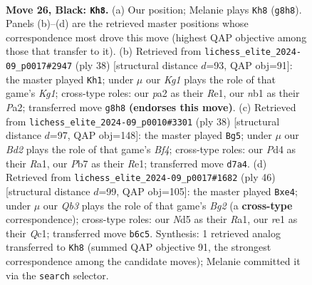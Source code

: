 \documentclass[11pt]{article}
\begin{document}
\clearpage

\begin{figure}[p]\centering
\begin{subfigure}{0.46\textwidth}\centering
\resizebox{\linewidth}{!}{%
\newchessgame
\chessboard[
  setfen={r3r1k1/bp1b1pp1/pq2p3/3n3P/3p4/BP4QB/P2P1P1P/RN2RK2 b - - 4 26},
  showmover=false,
  pgfstyle=straightmove, color=movearrow, markmove={g8-h8}
]}
\caption{}
\end{subfigure}\hfill
\begin{subfigure}{0.46\textwidth}\centering
\resizebox{\linewidth}{!}{%
\newchessgame
\chessboard[
  setfen={r1b1rn1k/5pp1/1pp2q1p/p2p4/3P1P2/2NBP2P/PPQ3P1/4RRK1 w - - 0 20},
  showmover=false,
  pgfstyle=straightmove, color=movearrow, markmove={g1-h1}
]}
\caption{}
\end{subfigure}
\\[4pt]
\begin{subfigure}{0.46\textwidth}\centering
\resizebox{\linewidth}{!}{%
\newchessgame
\chessboard[
  setfen={r1q3k1/1p1bbpp1/p3pnr1/7p/2P2B1P/PPN3P1/4QPB1/R3R1K1 w - - 0 20},
  showmover=false,
  pgfstyle=straightmove, color=movearrow, markmove={f4-g5}
]}
\caption{}
\end{subfigure}\hfill
\begin{subfigure}{0.46\textwidth}\centering
\resizebox{\linewidth}{!}{%
\newchessgame
\chessboard[
  setfen={r5k1/1p1b2p1/1q5p/p1b2r1P/P1p1p3/2Pp2BP/1P3PB1/R1Q2RK1 w - - 0 24},
  showmover=false,
  pgfstyle=straightmove, color=movearrow, markmove={g2-e4}
]}
\caption{}
\end{subfigure}
\caption{\textbf{Move 26, Black: \texttt{Kh8}.} (a) Our position; Melanie plays \texttt{Kh8} (\texttt{g8h8}). Panels (b)--(d) are the retrieved master positions whose correspondence most drove this move (highest QAP objective among those that transfer to it). (b) Retrieved from \texttt{lichess\_elite\_2024-09\_p0017\#2947} (ply 38) [structural distance $d$=93, QAP obj=91]: the master played \texttt{Kh1}; under $\mu$ our \emph{Kg1} plays the role of that game's \emph{Kg1}; cross-type roles: our \emph{p}a2 as their \emph{R}e1, our \emph{n}b1 as their \emph{P}a2; transferred move \texttt{g8h8} \textbf{(endorses this move)}. (c) Retrieved from \texttt{lichess\_elite\_2024-09\_p0010\#3301} (ply 38) [structural distance $d$=97, QAP obj=148]: the master played \texttt{Bg5}; under $\mu$ our \emph{Bd2} plays the role of that game's \emph{Bf4}; cross-type roles: our \emph{P}d4 as their \emph{R}a1, our \emph{P}b7 as their \emph{R}e1; transferred move \texttt{d7a4}. (d) Retrieved from \texttt{lichess\_elite\_2024-09\_p0017\#1682} (ply 46) [structural distance $d$=99, QAP obj=105]: the master played \texttt{Bxe4}; under $\mu$ our \emph{Qb3} plays the role of that game's \emph{Bg2} (a \textbf{cross-type} correspondence); cross-type roles: our \emph{N}d5 as their \emph{R}a1, our \emph{r}e1 as their \emph{Q}c1; transferred move \texttt{b6c5}. Synthesis: 1 retrieved analog transferred to \texttt{Kh8} (summed QAP objective 91, the strongest correspondence among the candidate moves); Melanie committed it via the \texttt{search} selector.}
\label{fig:thought-m51}
\end{figure}
\end{document}
